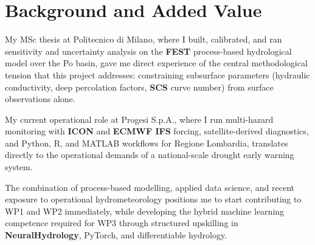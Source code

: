 \section{Background and Added Value}

My MSc thesis at Politecnico di Milano, where I built, calibrated, and ran sensitivity and uncertainty analysis on the \textbf{FEST} process-based hydrological model over the Po basin, gave me direct experience of the central methodological tension that this project addresses: constraining subsurface parameters (hydraulic conductivity, deep percolation factors, \textbf{SCS} curve number) from surface observations alone.

My current operational role at Progesi S.p.A., where I run multi-hazard monitoring with \textbf{ICON} and \textbf{ECMWF IFS} forcing, satellite-derived diagnostics, and Python, R, and MATLAB workflows for Regione Lombardia, translates directly to the operational demands of a national-scale drought early warning system.

The combination of process-based modelling, applied data science, and recent exposure to operational hydrometeorology positions me to start contributing to \textsc{WP1} and \textsc{WP2} immediately, while developing the hybrid machine learning competence required for \textsc{WP3} through structured upskilling in \textbf{NeuralHydrology}, PyTorch, and differentiable hydrology.
